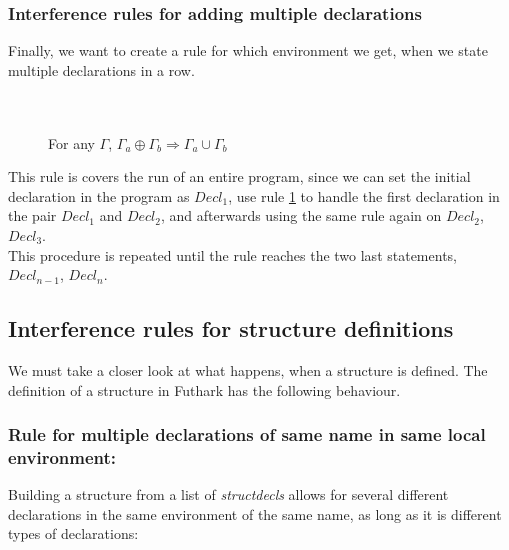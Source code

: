 \subsubsection{Interference rules for adding multiple declarations}
Finally, we want to create a rule for which environment we get, when we state
multiple declarations in a row.
\begin{figure}\label{Rule2multiple}
  \begin{tcolorbox}
    \begin{prooftree}
      \end{prooftree}
      \\
      \\
      For any $\Gamma$, $\Gamma_a \oplus \Gamma_b \Rightarrow \Gamma_a \cup \Gamma_b$
    \end{tcolorbox}
\end{figure}
This rule is covers the run of an entire program, since we can set the initial
declaration in the program as $Decl_1$, use rule \ref{Rule2multiple} to handle
the first declaration in the pair $Decl_1$ and $Decl_2$, and afterwards using
the same rule again on $Decl_2$, $Decl_3$.
\\
This procedure is repeated until the rule reaches the two last statements,
$Decl_{n-1}$, $Decl_n$. 

\subsection{Interference rules for structure definitions}
We must take a closer look at what happens, when a structure is defined.
The definition of a structure in Futhark has the following behaviour.
\subsubsection{Rule for multiple declarations of same name in same local environment:}
Building a structure from a list of \textit{structdecls} allows for several
different declarations in the same environment of the same name, as long as
it is different types of declarations:\\
\\


